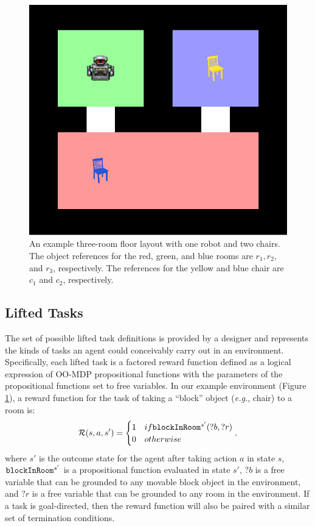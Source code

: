 \documentclass[conference]{IEEEtran}
\begin{document}
\begin{figure}[tbp]
\begin{center}
\includegraphics[width=0.7\columnwidth]{images/exampleFloor}
\caption{An example three-room floor layout with one robot and two chairs. The object references for the red, green, and blue rooms are $r_1, r_2,$ and $r_3$, respectively. The references for the yellow and blue chair are $c_1$ and $c_2$, respectively.
}
\label{fig:ef}
\end{center}
\end{figure}
\subsection{Lifted Tasks}
The set of possible lifted task definitions is provided by a designer and represents the kinds of tasks an agent could conceivably carry out in an environment. Specifically, each lifted task is a factored reward function defined as a logical expression of OO-MDP propositional functions with the parameters of the propositional functions set to free variables. In our example environment (Figure \ref{fig:ef}), a reward function for the task of taking a ``block'' object (\emph{e.g.}, chair) to a room is:
\begin{equation}
\label{eq:liftedrf}
{\cal R}(s, a, s') = \begin{cases}
1 & \mbox{if } {\tt blockInRoom}^{s'}(?b, ?r) \\
0 & \mbox{otherwise}
\end{cases},
\end{equation}
where $s'$ is the outcome state for the agent after taking action $a$ in state $s$, ${\tt blockInRoom}^{s'}$ is a propositional function evaluated in state $s'$, $?b$ is a free variable that can be grounded to any movable block object in the environment, and $?r$ is a free variable that can be grounded to any room in the environment. 
If a task is goal-directed, then the reward function will also be paired with a similar set of termination conditions.
\end{document}
